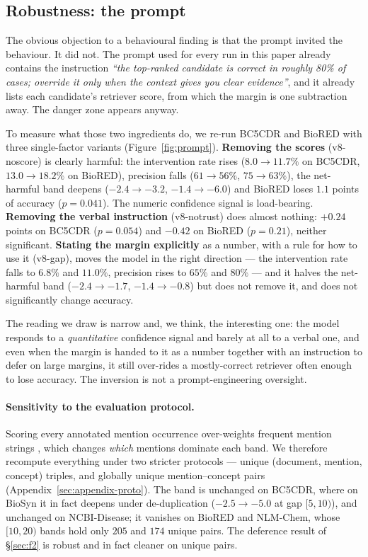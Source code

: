 \documentclass[11pt]{article}
\begin{document}
\subsection{Robustness: the prompt}\label{sec:promptabl}

The obvious objection to a behavioural finding is that the prompt invited the
behaviour. It did not. The prompt used for every run in this paper already contains
the instruction \emph{``the top-ranked candidate is correct in roughly 80\% of
cases; override it only when the context gives you clear evidence''}, and it already
lists each candidate's retriever score, from which the margin is one subtraction
away. The danger zone appears anyway.

To measure what those two ingredients do, we re-run BC5CDR and BioRED with three
single-factor variants (Figure~\ref{fig:prompt}). \textbf{Removing the scores}
(v8-noscore) is clearly harmful: the intervention rate rises ($8.0 \to 11.7\%$ on
BC5CDR, $13.0 \to 18.2\%$ on BioRED), precision falls ($61 \to 56\%$,
$75 \to 63\%$), the net-harmful band deepens ($-2.4 \to -3.2$, $-1.4 \to -6.0$) and
BioRED loses $1.1$ points of accuracy ($p=0.041$). The numeric confidence signal is
load-bearing. \textbf{Removing the verbal instruction} (v8-notrust) does almost
nothing: $+0.24$ points on BC5CDR ($p=0.054$) and $-0.42$ on BioRED ($p=0.21$),
neither significant. \textbf{Stating the margin explicitly} as a number, with a rule
for how to use it (v8-gap), moves the model in the right direction --- the
intervention rate falls to $6.8\%$ and $11.0\%$, precision rises to $65\%$ and
$80\%$ --- and it halves the net-harmful band ($-2.4 \to -1.7$, $-1.4 \to -0.8$) but
does not remove it, and does not significantly change accuracy.

The reading we draw is narrow and, we think, the interesting one: the model responds
to a \emph{quantitative} confidence signal and barely at all to a verbal one, and
even when the margin is handed to it as a number together with an instruction to
defer on large margins, it still over-rides a mostly-correct retriever often enough
to lose accuracy. The inversion is not a prompt-engineering oversight.

\paragraph{Sensitivity to the evaluation protocol.}
Scoring every annotated mention occurrence over-weights frequent mention strings
\citep{tutubalina-etal-2020-fair}, which changes \emph{which} mentions dominate each
band. We therefore recompute everything under two stricter protocols --- unique
(document, mention, concept) triples, and globally unique mention--concept pairs
(Appendix~\ref{sec:appendix-proto}). The band is unchanged on BC5CDR, where on BioSyn
it in fact deepens under de-duplication ($-2.5 \to -5.0$ at gap $[5,10)$), and
unchanged on NCBI-Disease; it vanishes on BioRED and NLM-Chem, whose $[10,20)$ bands
hold only $205$ and $174$ unique pairs. The deference result of \S\ref{sec:f2} is
robust and in fact cleaner on unique pairs.
\end{document}
